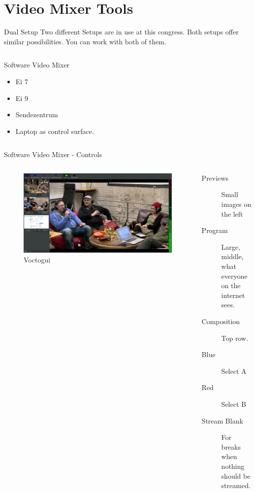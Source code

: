 \documentclass[aspectratio=169]{beamer}
\begin{document}
\section{Video Mixer Tools}

\begin{frame}{Dual Setup}
	Two different Setups are in use at this congress. 
	Both setups offer similar possibilities. 
	You can work with both of them.

	\begin{columns}[T,onlytextwidth]
		\begin{exampleblock}{Software Video Mixer}
			\begin{itemize}
				\item Ei 7
				\item Ei 9
				\item Sendezentrum
				\item Laptop as control surface.
			\end{itemize}
		\end{exampleblock}
	\end{columns}

\end{frame}

\begin{frame}{Software Video Mixer - Controls}
	\begin{columns}[T,onlytextwidth]
	\begin{figure} 
		\centering
		\includegraphics[width=1\textwidth]{images/voctomix.png}
		\caption{Voctogui}
		\label{fig:voctogui1}
	\end{figure}

	\begin{description}
		\item[Previews] Small images on the left 
		\item[Program] Large, middle, what everyone on the internet sees.
		\item[Composition] Top row.
		\item[Blue] Select A
		\item[Red] Select B
		\item[Stream Blank] For breaks when nothing should be streamed.
     \end{description}
	\end{columns}
\end{frame}
\end{document}
